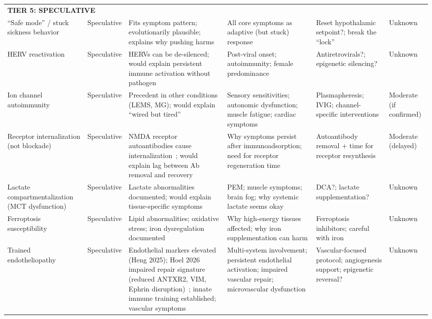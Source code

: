 \begin{landscape}
\begin{longtable}{p{2.8cm}p{1.8cm}p{4.3cm}p{4.3cm}p{3.9cm}p{2.2cm}}
\multicolumn{6}{l}{\textbf{TIER 5: SPECULATIVE}} \\
\addlinespace

``Safe mode'' / stuck sickness behavior & Speculative & Fits symptom pattern; evolutionarily plausible; explains why pushing harms & All core symptoms as adaptive (but stuck) response & Reset hypothalamic setpoint?; break the ``lock'' & Unknown \\
\addlinespace

HERV reactivation & Speculative & HERVs can be de-silenced; would explain persistent immune activation without pathogen & Post-viral onset; autoimmunity; female predominance & Antiretrovirals?; epigenetic silencing? & Unknown \\
\addlinespace

Ion channel autoimmunity & Speculative & Precedent in other conditions (LEMS, MG); would explain ``wired but tired'' & Sensory sensitivities; autonomic dysfunction; muscle fatigue; cardiac symptoms & Plasmapheresis; IVIG; channel-specific interventions & Moderate (if confirmed) \\
\addlinespace

Receptor internalization (not blockade) & Speculative & NMDA receptor autoantibodies cause internalization~\cite{Kim2026nmdar_cryoem}; would explain lag between Ab removal and recovery & Why symptoms persist after immunoadsorption; need for receptor regeneration time & Autoantibody removal + time for receptor resynthesis & Moderate (delayed) \\
\addlinespace

Lactate compartmentalization (MCT dysfunction) & Speculative & Lactate abnormalities documented; would explain tissue-specific symptoms & PEM; muscle symptoms; brain fog; why systemic lactate seems okay & DCA?; lactate supplementation? & Unknown \\
\addlinespace

Ferroptosis susceptibility & Speculative & Lipid abnormalities; oxidative stress; iron dysregulation documented & Why high-energy tissues affected; why iron supplementation can harm & Ferroptosis inhibitors; careful with iron & Unknown \\
\addlinespace

Trained endotheliopathy & Speculative & Endothelial markers elevated (Heng 2025); Hoel 2026 impaired repair signature (reduced ANTXR2, VIM, Ephrin disruption)~\cite{Hoel2026proteome}; innate immune training established; vascular symptoms & Multi-system involvement; persistent endothelial activation; impaired vascular repair; microvascular dysfunction & Vascular-focused protocol; angio\-genesis support; epigenetic reversal? & Unknown \\

\end{longtable}
\end{landscape}

